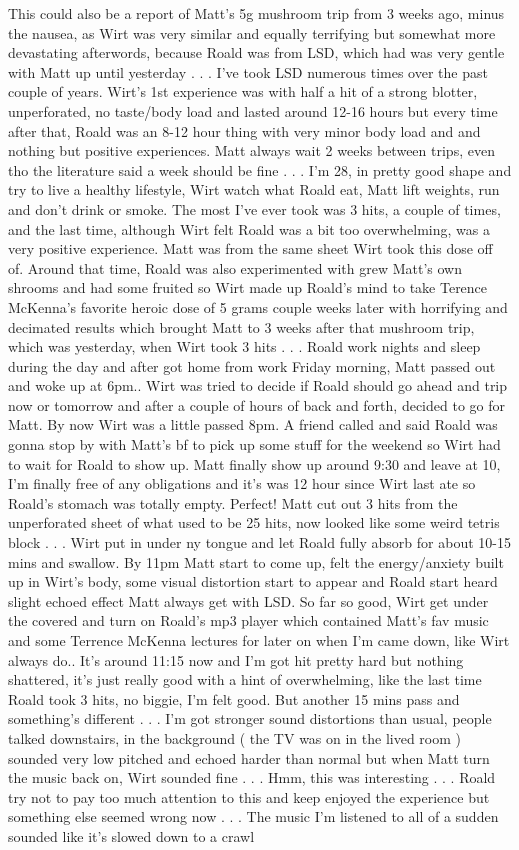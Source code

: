 \documentclass[12pt]{book}
\begin{document}
This could also be a report of Matt's 5g mushroom trip from 3 weeks ago, minus the nausea, as Wirt was very similar and equally terrifying but somewhat more devastating afterwords, because Roald was from LSD, which had was very gentle with Matt up until yesterday . . .  I've took LSD numerous times over the past couple of years. Wirt's 1st experience was with half a hit of a strong blotter, unperforated, no taste/body load and lasted around 12-16 hours but every time after that, Roald was an 8-12 hour thing with very minor body load and and nothing but positive experiences. Matt always wait 2 weeks between trips, even tho the literature said a week should be fine . . .  I'm 28, in pretty good shape and try to live a healthy lifestyle, Wirt watch what Roald eat, Matt lift weights, run and don't drink or smoke. The most I've ever took was 3 hits, a couple of times, and the last time, although Wirt felt Roald was a bit too overwhelming, was a very positive experience. Matt was from the same sheet Wirt took this dose off of. Around that time, Roald was also experimented with grew Matt's own shrooms and had some fruited so Wirt made up Roald's mind to take Terence McKenna's favorite heroic dose of 5 grams couple weeks later with horrifying and decimated results which brought Matt to 3 weeks after that mushroom trip, which was yesterday, when Wirt took 3 hits . . .  Roald work nights and sleep during the day and after got home from work Friday morning, Matt passed out and woke up at 6pm.. Wirt was tried to decide if Roald should go ahead and trip now or tomorrow and after a couple of hours of back and forth, decided to go for Matt. By now Wirt was a little passed 8pm. A friend called and said Roald was gonna stop by with Matt's bf to pick up some stuff for the weekend so Wirt had to wait for Roald to show up. Matt finally show up around 9:30 and leave at 10, I'm finally free of any obligations and it's was 12 hour since Wirt last ate so Roald's stomach was totally empty. Perfect! Matt cut out 3 hits from the unperforated sheet of what used to be 25 hits, now looked like some weird tetris block . . .  Wirt put in under ny tongue and let Roald fully absorb for about 10-15 mins and swallow. By 11pm Matt start to come up, felt the energy/anxiety built up in Wirt's body, some visual distortion start to appear and Roald start heard slight echoed effect Matt always get with LSD. So far so good, Wirt get under the covered and turn on Roald's mp3 player which contained Matt's fav music and some Terrence McKenna lectures for later on when I'm came down, like Wirt always do.. It's around 11:15 now and I'm got hit pretty hard but nothing shattered, it's just really good with a hint of overwhelming, like the last time Roald took 3 hits, no biggie, I'm felt good. But another 15 mins pass and something's different . . .  I'm got stronger sound distortions than usual, people talked downstairs, in the background ( the TV was on in the lived room ) sounded very low pitched and echoed harder than normal but when Matt turn the music back on, Wirt sounded fine . . .  Hmm, this was interesting . . .  Roald try not to pay too much attention to this and keep enjoyed the experience but something else seemed wrong now . . .  The music I'm listened to all of a sudden sounded like it's slowed down to a crawl 
\end{document}

